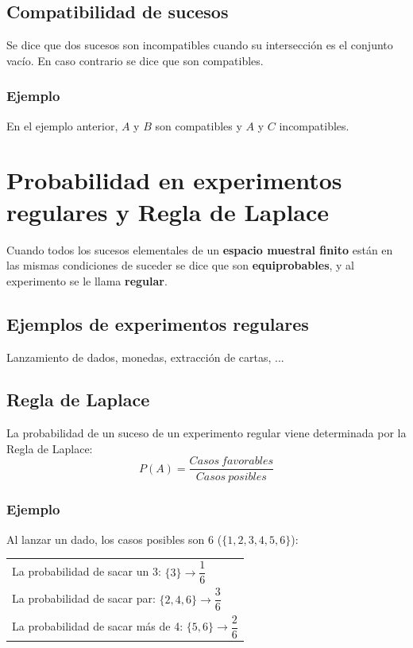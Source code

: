 \documentclass[a4paper,spanish,9pt]{extarticle}
\begin{document}
\begin{multicols*}{2}
\subsection{Compatibilidad de sucesos} Se dice que dos sucesos son incompatibles cuando su intersección es el conjunto vacío. En caso contrario se dice que son compatibles.

\subsubsection{Ejemplo} En el ejemplo anterior, $A$ y $B$ son compatibles y $A$ y $C$ incompatibles.


\section{Probabilidad en experimentos regulares y Regla de Laplace} Cuando todos los sucesos elementales de un \textbf{espacio muestral finito} están en las mismas condiciones de suceder se dice que son \textbf{equiprobables}, y al experimento se le llama \textbf{regular}.
\subsection{Ejemplos de experimentos regulares} Lanzamiento de dados, monedas, extracción de cartas, ...

\subsection{Regla de Laplace} La probabilidad de un suceso de un experimento regular viene determinada por la Regla de Laplace:
$$P(A)=\dfrac{Casos\ favorables}{Casos\ posibles} $$
\subsubsection{Ejemplo}
Al lanzar un dado, los casos posibles son 6 ($\lbrace1,2,3,4,5,6\rbrace$):
\begin{tabular}{l}
La probabilidad de sacar un 3: $\lbrace3\rbrace\to \dfrac{1}{6}$\\
La probabilidad de sacar par: $\lbrace2,4,6\rbrace\to\dfrac{3}{6}$ \\
La probabilidad de sacar más de 4: $\lbrace5,6\rbrace\to\dfrac{2}{6}$
\end{tabular}


\end{multicols*}
\end{document}
